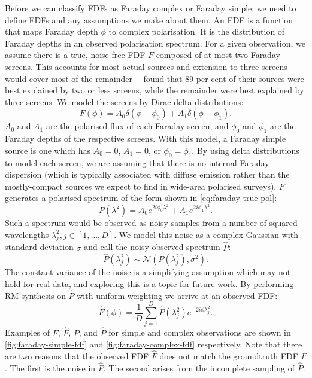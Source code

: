 \documentclass[11pt, a4paper]{book}
\begin{document}
    Before we can classify FDFs as Faraday complex or Faraday simple, we need to define FDFs and any assumptions we make about them. An FDF is a function that maps Faraday depth $\phi$ to complex polarisation. It is the distribution of Faraday depths in an observed polarisation spectrum. For a given observation, we assume there is a true, noise-free FDF $F$ composed of at most two Faraday screens. This accounts for most actual sources \citep{anderson_broadband_2015} and extension to three screens would cover most of the remainder---\citet{osullivan_broad-band_2017} found that 89 per cent of their sources were best explained by two or less screens, while the remainder were best explained by three screens. We model the screens by Dirac delta distributions:
    \begin{equation}
        \label{eq:faraday-true-fdf}
        F(\phi) = A_0 \delta(\phi - \phi_0) + A_1 \delta(\phi - \phi_1).
    \end{equation}
    $A_0$ and $A_1$ are the polarised flux of each Faraday screen, and $\phi_0$ and $\phi_1$ are the Faraday depths of the respective screens. With this model, a Faraday simple source is one which has $A_0 = 0$, $A_1 = 0$, or $\phi_0 = \phi_1$. By using delta distributions to model each screen, we are assuming that there is no internal Faraday dispersion (which is typically associated with diffuse emission rather than the mostly-compact sources we expect to find in wide-area polarised surveys). $F$ generates a polarised spectrum of the form shown in \autoref{eq:faraday-true-pol}:
    \begin{equation}
        \label{eq:faraday-true-pol}
        P(\lambda^2) = A_0 e^{2i\phi_0\lambda^2} + A_1 e^{2i\phi_1\lambda^2}.
    \end{equation}
    Such a spectrum would be observed as noisy samples from a number of squared wavelengths $\lambda^2_j, j \in [1, \dots, D]$. We model this noise as a complex Gaussian with standard deviation $\sigma$ and call the noisy observed spectrum $\hat P$:
    \begin{equation}
      \label{eq:faraday-noisy-pol}
      \hat P(\lambda_j^2) \sim \mathcal N(P(\lambda^2_j), \sigma^2).
    \end{equation}
    The constant variance of the noise is a simplifying assumption which may not hold for real data, and exploring this is a topic for future work. By performing RM synthesis \citep{brentjens_faraday_2005} on $\hat P$ with uniform weighting we arrive at an observed FDF:
    \begin{equation}
      \label{eq:faraday-rm-synthesis}
      \hat F(\phi) = \frac{1}{D} \sum_{j = 1}^D \hat P(\lambda^2_j) e^{-2i\phi\lambda^2_j}.
    \end{equation}
    Examples of $F$, $\hat F$, $P$, and $\hat P$ for simple and complex observations are shown in \autoref{fig:faraday-simple-fdf} and \autoref{fig:faraday-complex-fdf} respectively. Note that there are two reasons that the observed FDF $\hat F$ does not match the groundtruth FDF $F$. The first is the noise in $\hat P$. The second arises from the incomplete sampling of $\hat P$.
\end{document}
